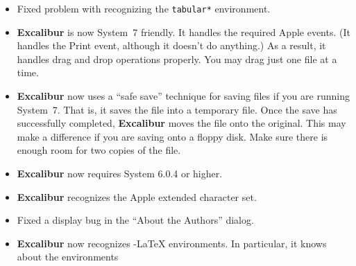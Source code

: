 \documentclass[11pt,titlepage]{article}
\newcommand{\ex}{\textbf{Excalibur}}
\newcommand{\AmS}{\latex{{\protect\the\textfont2
        A\kern-.1667em\lower.5ex\hbox{M}\kern-.125emS}}\html{AMS}}
\begin{document}
\begin{itemize}

\item Fixed problem with recognizing the \texttt{tabular*}
  environment.

\item \ex{} is now System~7 friendly. It handles the required Apple
  events. (It handles the Print event, although it doesn't do
  anything.) As a result, it handles drag and drop operations
  properly. You may drag just one file at a time.

\item \ex{} now uses a ``safe save'' technique for saving files if you
  are running System~7. That is, it saves the file into a temporary
  file. Once the save has successfully completed, \ex{} moves the file
  onto the original.  This may make a difference if you are saving
  onto a floppy disk.  Make sure there is enough room for two copies
  of the file.

\item \ex{} now requires System 6.0.4 or higher.

\item \ex{} recognizes the Apple extended character set.

\item Fixed a display bug in the ``About the Authors'' dialog.

\item \ex{} now recognizes \AmS-\LaTeX{} environments. In particular,
  it knows about the environments



\end{itemize}
\end{document}
